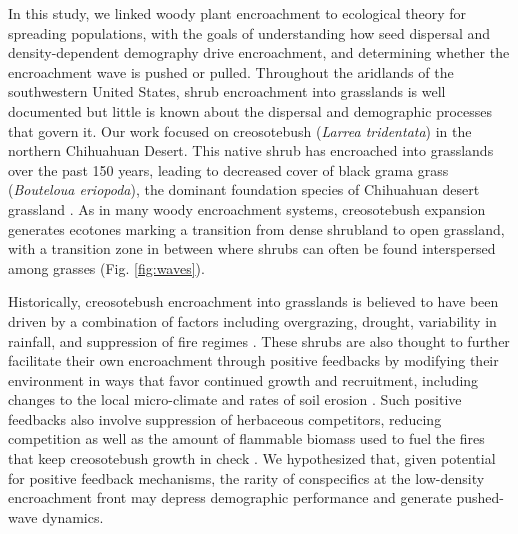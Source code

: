 \documentclass[11pt]{article}\usepackage[]{graphicx}\usepackage[usenames,dvipsnames]{xcolor}
\begin{document}
In this study, we linked woody plant encroachment to ecological theory for spreading populations, with the goals of understanding how seed dispersal and density-dependent demography drive encroachment, and determining whether the encroachment wave is pushed or pulled.
Throughout the aridlands of the southwestern United States, shrub encroachment into grasslands is well documented \citep{d2012synthetic} but little is known about the dispersal and demographic processes that govern it. 
Our work focused on creosotebush (\textit{Larrea tridentata}) in the northern Chihuahuan Desert. 
This native shrub has encroached into grasslands over the past 150 years, leading to decreased cover of black grama grass (\textit{Bouteloua eriopoda}), the dominant foundation species of Chihuahuan desert grassland \citep{gardner1951vegetation, buffington1965vegetational, gibbens2005vegetation}.
As in many woody encroachment systems, creosotebush expansion generates ecotones marking a transition from dense shrubland to open grassland, with a transition zone in between where shrubs can often be found interspersed among grasses (Fig. \ref{fig:waves}).

Historically, creosotebush encroachment into grasslands is believed to have been driven by a combination of factors including overgrazing, drought, variability in rainfall, and suppression of fire regimes \citep{moreno2016seed}.
These shrubs are also thought to further facilitate their own encroachment through positive feedbacks \citep{grover1990shrubland, d2012synthetic} by modifying their environment in ways that favor continued growth and recruitment, including changes to the local micro-climate \citep{d2010positive} and rates of soil erosion \citep{turnbull2010changes}.
Such positive feedbacks also involve suppression of herbaceous competitors, reducing competition as well as the amount of flammable biomass used to fuel the fires that keep creosotebush growth in check \citep{van2000shrub}.
We hypothesized that, given potential for positive feedback mechanisms, the rarity of conspecifics at the low-density encroachment front may depress demographic performance and generate pushed-wave dynamics.

\end{document}
